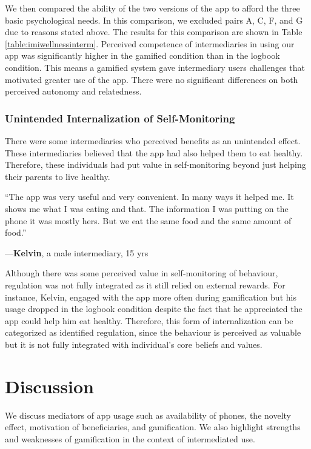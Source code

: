 \documentclass{sig-alternate}
\newenvironment{myquote}
               {\list{}{\rightmargin   \leftmargin
                        \parsep        0in }%
                \item\relax}
               {\endlist}
\newcommand{\userquote}[2]{\begin{samepage}\begin{myquote} 
     \em{\small{#2\begin{flushright}---#1\end{flushright}}}
   \end{myquote}\end{samepage}}
\begin{document}
We then compared the ability of the two versions of the app to afford the three basic psychological needs. In this comparison, we excluded pairs A, C, F, and G due to reasons stated above. The results for this comparison are shown in Table \ref{table:imiwellnessinterm}. Perceived competence of intermediaries in using our app was significantly higher in the gamified condition than in the logbook condition. This means a gamified system gave intermediary users challenges that motivated greater use of the app. There were no significant differences on both perceived autonomy and relatedness. 

\subsubsection{Unintended Internalization of Self-Monitoring}
There were some intermediaries who perceived benefits as an unintended effect. These intermediaries believed that the app had also helped them to eat healthy. Therefore, these individuals had put value in self-monitoring beyond just helping their parents to live healthy. 

\userquote{\textbf{Kelvin}, a male intermediary, 15 yrs} {``The app was very useful and very convenient. In many ways it helped me.  It shows me what I was eating and that. The information I was putting on the phone it was mostly hers. But we eat the same food and the same amount of food.''} 

Although there was some perceived value in self-monitoring of behaviour, regulation was not fully integrated as it still relied on external rewards. For instance, Kelvin, engaged with the app more often during gamification but his usage dropped in the logbook condition despite the fact that he appreciated the app could help him eat healthy. Therefore, this form of internalization can be categorized as identified regulation, since the behaviour is perceived as valuable but it is not fully integrated with individual's core beliefs and values.

\section{Discussion}
We discuss mediators of app usage such as availability of phones, the novelty effect, motivation of beneficiaries, and gamification. We also highlight strengths and weaknesses of gamification in the context of intermediated use.
\end{document}
